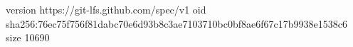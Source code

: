 version https://git-lfs.github.com/spec/v1
oid sha256:76ec75f756f81dabc70e6d93b8c3ae7103710bc0bf8ae6f67c17b9938e1538c6
size 10690
